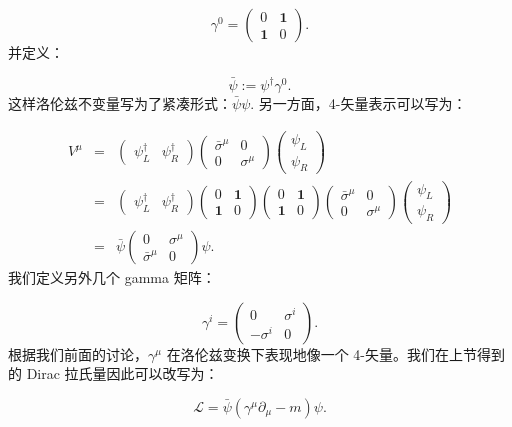 \documentclass[10pt,UTF8]{ctexart}
\begin{document}
\begin{equation}
\gamma^{0}=\left(\begin{array}{cc}
0 & \bm{1}\\
\bm{1} & 0
\end{array}\right).
\end{equation}
并定义：

\begin{equation}
\bar{\psi}:=\psi^{\dagger}\gamma^{0}.
\end{equation}
这样洛伦兹不变量写为了紧凑形式：$\bar{\psi}\psi$. 另一方面，4-矢量表示可以写为：

\begin{eqnarray}
V^{\mu} & = & \left(\begin{array}{cc}
\psi_{L}^{\dagger} & \psi_{R}^{\dagger}\end{array}\right)\left(\begin{array}{cc}
\bar{\sigma}^{\mu} & 0\\
0 & \sigma^{\mu}
\end{array}\right)\left(\begin{array}{c}
\psi_{L}\\
\psi_{R}
\end{array}\right)\nonumber \\
 & = & \left(\begin{array}{cc}
\psi_{L}^{\dagger} & \psi_{R}^{\dagger}\end{array}\right)\left(\begin{array}{cc}
0 & \bm{1}\\
\bm{1} & 0
\end{array}\right)\left(\begin{array}{cc}
0 & \bm{1}\\
\bm{1} & 0
\end{array}\right)\left(\begin{array}{cc}
\bar{\sigma}^{\mu} & 0\\
0 & \sigma^{\mu}
\end{array}\right)\left(\begin{array}{c}
\psi_{L}\\
\psi_{R}
\end{array}\right)\nonumber \\
 & = & \bar{\psi}\left(\begin{array}{cc}
0 & \sigma^{\mu}\\
\bar{\sigma}^{\mu} & 0
\end{array}\right)\psi.
\end{eqnarray}
我们定义另外几个 gamma 矩阵：

\begin{equation}
\gamma^{i}=\left(\begin{array}{cc}
0 & \sigma^{i}\\
-\sigma^{i} & 0
\end{array}\right).
\end{equation}
根据我们前面的讨论，$\gamma^{\mu}$ 在洛伦兹变换下表现地像一个 4-矢量。我们在上节得到的 Dirac 拉氏量因此可以改写为：

\begin{equation}
\mathcal{L}=\bar{\psi}\left(\gamma^{\mu}\partial_{\mu}-m\right)\psi.
\end{equation}
\end{document}
